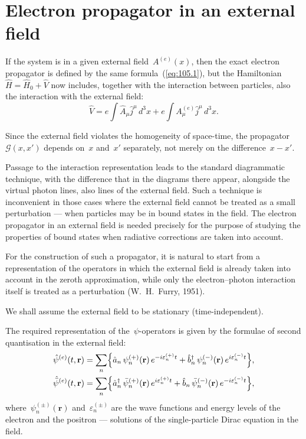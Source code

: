 
\section{Electron propagator in an external field}


If the system is in a given external field~$A^{(e)}(x)$, then the exact electron propagator is defined by the same formula~(\ref{eq:105.1}), but the Hamiltonian~$\hat{H} = \hat{H}_0 + \hat{V}$ now includes, together with the interaction between particles, also the interaction with the external field:
\begin{equation}
\hat{V} = e\!\int\!\hat{A}_\mu\hat{j}^\mu\,d^3x + e\!\int\!A^{(e)}_\mu\hat{j}^\mu\,d^3x.
\label{eq:109.1}
\end{equation}

Since the external field violates the homogeneity of space-time, the propagator~$\mathcal{G}(x, x')$ depends on~$x$ and~$x'$ separately, not merely on the difference~$x - x'$.

Passage to the interaction representation leads to the standard diagrammatic technique, with the difference that in the diagrams there appear, alongside the virtual photon lines, also lines of the external field. Such a technique is inconvenient in those cases where the external field cannot be treated as a small perturbation --- when particles may be in bound states in the field. The electron propagator in an external field is needed precisely for the purpose of studying the properties of bound states when radiative corrections are taken into account.

For the construction of such a propagator, it is natural to start from a representation of the operators in which the external field is already taken into account in the zeroth approximation, while only the electron--photon interaction itself is treated as a perturbation (W.~H.~Furry, 1951).

We shall assume the external field to be stationary (time-independent).

The required representation of the~$\psi$-operators is given by the formulae of second quantisation in the external field:
\begin{align}
\hat{\psi}^{(e)}(t, \mathbf{r}) &= \sum_n\Bigl\{\hat{a}_n\,\psi_n^{(+)}(\mathbf{r})\,e^{-i\varepsilon_n^{(+)}t} + \hat{b}_n^\dagger\,\psi_n^{(-)}(\mathbf{r})\,e^{i\varepsilon_n^{(-)}t}\Bigr\}, \notag \\
\hat{\bar{\psi}}^{(e)}(t, \mathbf{r}) &= \sum_n\Bigl\{\hat{a}_n^\dagger\,\bar{\psi}_n^{(+)}(\mathbf{r})\,e^{i\varepsilon_n^{(+)}t} + \hat{b}_n\,\bar{\psi}_n^{(-)}(\mathbf{r})\,e^{-i\varepsilon_n^{(-)}t}\Bigr\},
\label{eq:109.2}
\end{align}
where~$\psi_n^{(\pm)}(\mathbf{r})$ and~$\varepsilon_n^{(\pm)}$ are the wave functions and energy levels of the electron and the positron --- solutions of the single-particle Dirac equation in the field.

